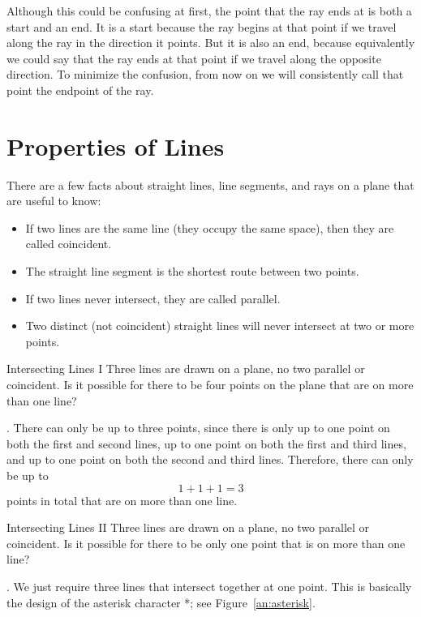 \documentclass[a4paper,10pt]{report}
\begin{document}
Although this could be confusing at first, the point that the ray ends at is
both a start and an end. It is a start because the ray begins at that point if
we travel along the ray in the direction it points. But it is also an end,
because equivalently we could say that the ray ends at that point if we travel
along the opposite direction. To minimize the confusion, from now on we will
consistently call that point the \gls{endpoint} of the ray.

\section{Properties of Lines}

There are a few facts about straight lines, line segments, and rays on a plane
that are useful to know:

\begin{itemize}
 \item If two lines are the same line (they occupy the same space), then they
 are called \gls{coincident}.
 \item The straight line segment is the shortest route between two points.
 \item If two lines never intersect, they are called \gls{parallel}.
 \item Two distinct (not coincident) straight lines will never intersect at two
 or more points.
\end{itemize}

\begin{problem}{Intersecting Lines I}
 Three lines are drawn on a plane, no two parallel or coincident. Is it possible
 for there to be four points on the plane that are on more than one line?

 \begin{solution}
  . There can only be up to three points, since there is only up to one
  point on both the first and second lines, up to one point on both the first
  and third lines, and up to one point on both the second and third lines.
  Therefore, there can only be up to \[ 1 + 1 + 1 = 3 \] points in total that
  are on more than one line.
 \end{solution}
\end{problem}

\begin{problem}{Intersecting Lines II}
 Three lines are drawn on a plane, no two parallel or coincident. Is it possible
 for there to be only one point that is on more than one line?

 \begin{solution}
  . We just require three lines that intersect together at one point.
  This is basically the design of the asterisk character *; see
  Figure~\ref{an:asterisk}.
 \end{solution}
\end{problem}
\end{document}
